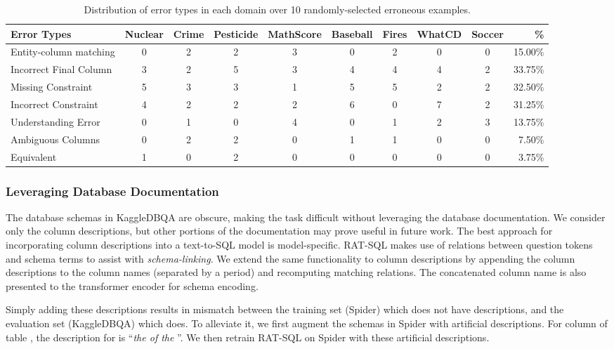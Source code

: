 \documentclass[11pt,a4paper]{article}
\newcommand{\systemname}{\mbox{KaggleDBQA}\xspace}
\begin{document}
\begin{table*}[t]
    \small
    \centering
    \caption{Distribution of error types in each domain over 10 randomly-selected erroneous examples.}
    \label{tab:error}
\begin{tabular}{lccccccccr}
        \toprule
        \textbf{Error Types}  & Nuclear & Crime & Pesticide & MathScore & Baseball & Fires & WhatCD & Soccer  & \% \\
        \midrule
        Entity-column matching & 0  & 2 & 2 & 3 & 0 & 2 & 0  & 0  &  15.00\% \\
        Incorrect Final Column & 3 & 2 & 5 & 3 & 4 & 4 & 4 & 2 & 33.75\%\\
        Missing Constraint  & 5 & 3 & 3 & 1 & 5 & 5 & 2 & 2 & 32.50\%\\
        Incorrect Constraint  & 4 & 2 & 2 & 2 & 6 & 0 & 7 & 2 & 31.25\%\\
        Understanding Error  &  0 & 1 & 0 & 4 & 0 & 1 & 2 & 3 & 13.75\% \\
        Ambiguous Columns & 0  & 2 & 2 & 0 & 1 & 1 & 0 & 0 & 7.50\%\\
        Equivalent  & 1 & 0 & 2 & 0 & 0 & 0 & 0 & 0 & 3.75\%\\
        \bottomrule
    \end{tabular}
\end{table*}

\subsubsection{Leveraging Database Documentation}
The database schemas in \systemname are obscure, making the task difficult without leveraging the database
documentation. We consider only the column descriptions, but other portions of the documentation may prove useful in
future work. The best approach for incorporating column descriptions into a text-to-SQL model is model-specific. RAT-SQL
makes use of relations between question tokens and schema terms to assist with \textit{schema-linking}. We extend the
same functionality to column descriptions by appending the column descriptions to the column names (separated by a
period) and recomputing matching relations. The concatenated column name is also presented to the transformer encoder
for schema encoding.


Simply adding these descriptions results in mismatch between the training set (Spider) which does not have
descriptions, and the evaluation set (\systemname) which does.
To alleviate it, we first augment the schemas in Spider with artificial descriptions.
For column  of table , the description for  is ``\textit{the  of the }''.
We then retrain RAT-SQL on Spider with these artificial descriptions.
\end{document}
